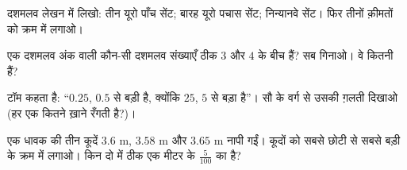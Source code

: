 \begin{exercise}[$\star$]\label{exo:g4:decimals:8}
दशमलव लेखन में लिखो: तीन यूरो पाँच सेंट; बारह यूरो पचास सेंट;
निन्यानवे सेंट। फिर तीनों क़ीमतों को क्रम में लगाओ।
\end{exercise}

\begin{exercise}[$\star$]\label{exo:g4:decimals:9}
एक दशमलव अंक वाली कौन-सी दशमलव संख्याएँ ठीक $3$ और $4$ के बीच
हैं? सब गिनाओ। वे कितनी हैं?
\end{exercise}

\begin{exercise}[$\star\star$]\label{exo:g4:decimals:10}
टॉम कहता है: ``$0.25$, $0.5$ से बड़ी है, क्योंकि $25$, $5$ से
बड़ा है''। सौ के वर्ग से उसकी ग़लती दिखाओ (हर एक कितने ख़ाने
रँगती है?)।
\end{exercise}

\begin{exercise}[$\star\star$]\label{exo:g4:decimals:11}
एक धावक की तीन कूदें $3.6$ m, $3.58$ m और $3.65$ m नापी गईं।
कूदों को सबसे छोटी से सबसे बड़ी के क्रम में लगाओ। किन दो में
ठीक एक मीटर के $\frac{5}{100}$ का  है?
\end{exercise}
